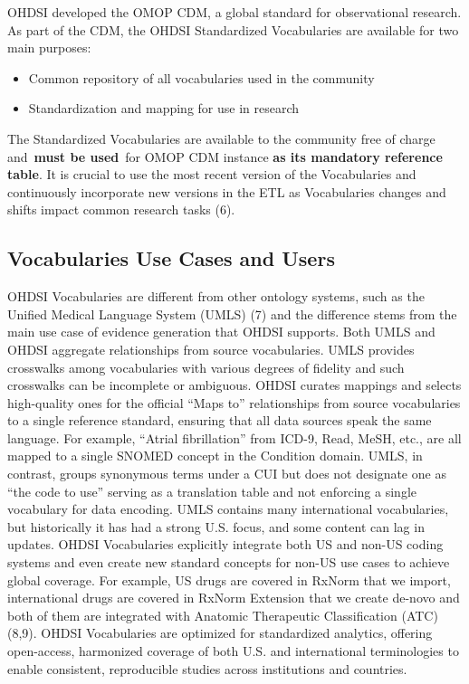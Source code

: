 \documentclass[
  letterpaper,
  paper=7in:10in,
  pagesize=pdftex,
  headinclude=on,
  footinclude=on,
  12pt]{scrbook}
\begin{document}
OHDSI developed the OMOP CDM, a global standard for observational
research. As part of the CDM, the OHDSI Standardized Vocabularies are
available for two main purposes:

\begin{itemize}
\item
  Common repository of all vocabularies used in the community
\item
  Standardization and mapping for use in research
\end{itemize}

The Standardized Vocabularies are available to the community free of
charge and~\textbf{must be used}~for OMOP CDM instance \textbf{as its
mandatory reference table}. It is crucial to use the most recent version
of the Vocabularies and continuously incorporate new versions in the ETL
as Vocabularies changes and shifts impact common research tasks (6).

\subsection{Vocabularies Use Cases and
Users}\label{vocabularies-use-cases-and-users}

OHDSI Vocabularies are different from other ontology systems, such as
the Unified Medical Language System (UMLS) (7) and the difference stems
from the main use case of evidence generation that OHDSI supports. Both
UMLS and OHDSI aggregate relationships from source vocabularies. UMLS
provides crosswalks among vocabularies with various degrees of fidelity
and such crosswalks can be incomplete or ambiguous. OHDSI curates
mappings and selects high-quality ones for the official ``Maps to''
relationships from source vocabularies to a single reference standard,
ensuring that all data sources speak the same language. For example,
``Atrial fibrillation'' from ICD-9, Read, MeSH, etc., are all mapped to
a single SNOMED concept in the Condition domain. UMLS, in contrast,
groups synonymous terms under a CUI but does not designate one as ``the
code to use'' serving as a translation table and not enforcing a single
vocabulary for data encoding. UMLS contains many international
vocabularies, but historically it has had a strong U.S. focus, and some
content can lag in updates. OHDSI Vocabularies explicitly integrate both
US and non-US coding systems and even create new standard concepts for
non-US use cases to achieve global coverage. For example, US drugs are
covered in RxNorm that we import, international drugs are covered in
RxNorm Extension that we create de-novo and both of them are integrated
with Anatomic Therapeutic Classification (ATC) (8,9). OHDSI Vocabularies
are optimized for standardized analytics, offering open-access,
harmonized coverage of both U.S. and international terminologies to
enable consistent, reproducible studies across institutions and
countries.
\end{document}
